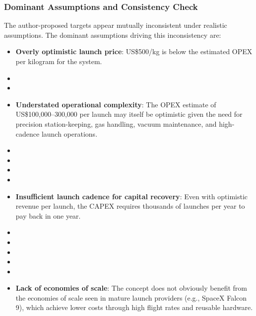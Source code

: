 \subsubsection{Dominant Assumptions and Consistency Check}
The author-proposed targets appear mutually inconsistent under realistic assumptions. The dominant assumptions driving this inconsistency are:
\begin{itemize}
    \item \textbf{Overly optimistic launch price}: US\$500/kg is below the estimated OPEX per kilogram for the system.
    \item \item \item \textbf{Understated operational complexity}: The OPEX estimate of US\$100,000–300,000 per launch may itself be optimistic given the need for precision station-keeping, gas handling, vacuum maintenance, and high-cadence launch operations.
    \item \item \item \item \item \textbf{Insufficient launch cadence for capital recovery}: Even with optimistic revenue per launch, the CAPEX requires thousands of launches per year to pay back in one year.
    \item \item \item \item \item \item \textbf{Lack of economies of scale}: The concept does not obviously benefit from the economies of scale seen in mature launch providers (e.g., SpaceX Falcon 9), which achieve lower costs through high flight rates and reusable hardware.
\end{itemize}

